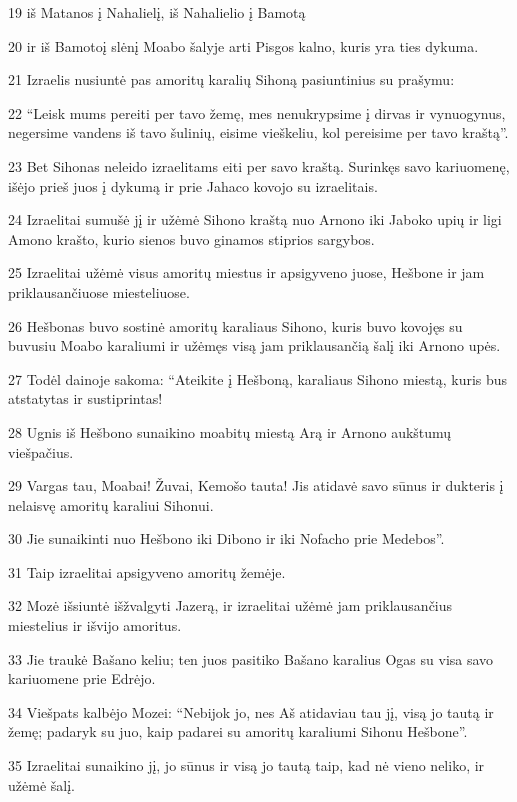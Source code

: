 \par 19 iš Matanos į Nahalielį, iš Nahalielio į Bamotą 
\par 20 ir iš Bamoto­į slėnį Moabo šalyje arti Pisgos kalno, kuris yra ties dykuma. 
\par 21 Izraelis nusiuntė pas amoritų karalių Sihoną pasiuntinius su prašymu: 
\par 22 “Leisk mums pereiti per tavo žemę, mes nenukrypsime į dirvas ir vynuogynus, negersime vandens iš tavo šulinių, eisime vieškeliu, kol pereisime per tavo kraštą”. 
\par 23 Bet Sihonas neleido izraelitams eiti per savo kraštą. Surinkęs savo kariuomenę, išėjo prieš juos į dykumą ir prie Jahaco kovojo su izraelitais. 
\par 24 Izraelitai sumušė jį ir užėmė Sihono kraštą nuo Arnono iki Jaboko upių ir ligi Amono krašto, kurio sienos buvo ginamos stiprios sargybos. 
\par 25 Izraelitai užėmė visus amoritų miestus ir apsigyveno juose, Hešbone ir jam priklausančiuose miesteliuose. 
\par 26 Hešbonas buvo sostinė amoritų karaliaus Sihono, kuris buvo kovojęs su buvusiu Moabo karaliumi ir užėmęs visą jam priklausančią šalį iki Arnono upės. 
\par 27 Todėl dainoje sakoma: “Ateikite į Hešboną, karaliaus Sihono miestą, kuris bus atstatytas ir sustiprintas! 
\par 28 Ugnis iš Hešbono sunaikino moabitų miestą Arą ir Arnono aukštumų viešpačius. 
\par 29 Vargas tau, Moabai! Žuvai, Kemošo tauta! Jis atidavė savo sūnus ir dukteris į nelaisvę amoritų karaliui Sihonui. 
\par 30 Jie sunaikinti nuo Hešbono iki Dibono ir iki Nofacho prie Medebos”. 
\par 31 Taip izraelitai apsigyveno amoritų žemėje. 
\par 32 Mozė išsiuntė išžvalgyti Jazerą, ir izraelitai užėmė jam priklausančius miestelius ir išvijo amoritus. 
\par 33 Jie traukė Bašano keliu; ten juos pasitiko Bašano karalius Ogas su visa savo kariuomene prie Edrėjo. 
\par 34 Viešpats kalbėjo Mozei: “Nebijok jo, nes Aš atidaviau tau jį, visą jo tautą ir žemę; padaryk su juo, kaip padarei su amoritų karaliumi Sihonu Hešbone”. 
\par 35 Izraelitai sunaikino jį, jo sūnus ir visą jo tautą taip, kad nė vieno neliko, ir užėmė šalį.



